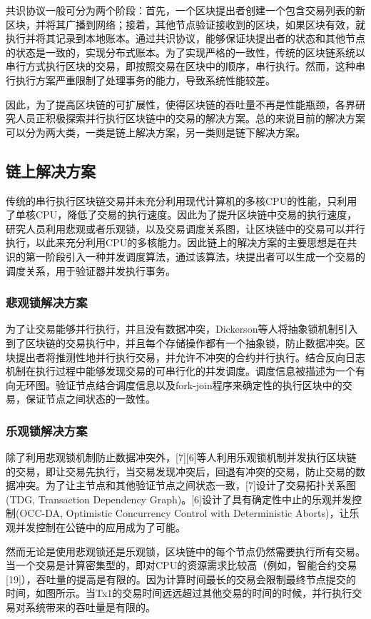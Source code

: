 共识协议一般可分为两个阶段：首先，一个区块提出者创建一个包含交易列表的新区块，并将其广播到网络；接着，其他节点验证接收到的区块，如果区块有效，就执行并将其记录到本地账本。通过共识协议，能够保证块提出者的状态和其他节点的状态是一致的，实现分布式账本。为了实现严格的一致性，传统的区块链系统以串行方式执行区块的交易，即按照交易在区块中的顺序，串行执行。然而，这种串行执行方案严重限制了处理事务的能力，导致系统性能较差。

因此，为了提高区块链的可扩展性，使得区块链的吞吐量不再是性能瓶颈，各界研究人员正积极探索并行执行区块链中的交易的解决方案。总的来说目前的解决方案可以分为两大类，一类是链上解决方案，另一类则是链下解决方案。

\subsection{链上解决方案}
传统的串行执行区块链交易并未充分利用现代计算机的多核CPU的性能，只利用了单核CPU，降低了交易的执行速度。因此为了提升区块链中交易的执行速度，研究人员利用悲观或者乐观锁，以及交易调度关系图，让区块链中的交易可以并行执行，以此来充分利用CPU的多核能力。因此链上的解决方案的主要思想是在共识的第一阶段引入一种并发调度算法，通过该算法，块提出者可以生成一个交易的调度关系，用于验证器并发执行事务。

\subsubsection{悲观锁解决方案}
为了让交易能够并行执行，并且没有数据冲突，Dickerson等人将抽象锁机制引入到了区块链的交易执行中，并且每个存储操作都有一个抽象锁，防止数据冲突。区块提出者将推测性地并行执行交易，并允许不冲突的合约并行执行。结合反向日志机制在执行过程中能够发现交易的可串行化的并发调度。调度信息被描述为一个有向无环图。验证节点结合调度信息以及fork-join程序来确定性的执行区块中的交易，保证节点之间状态的一致性。

\subsubsection{乐观锁解决方案}
除了利用悲观锁机制防止数据冲突外，[7][6]等人利用乐观锁机制并发执行区块链的交易，即让交易先执行，当交易发现冲突后，回退有冲突的交易，防止交易的数据冲突。为了让主节点和其他验证节点之间状态一致，[7]设计了交易拓扑关系图(TDG, Transaction Dependency Graph)。[6]设计了具有确定性中止的乐观并发控制(OCC-DA, Optimistic Concurrency Control with Deterministic Aborts)，让乐观并发控制在公链中的应用成为了可能。

然而无论是使用悲观锁还是乐观锁，区块链中的每个节点仍然需要执行所有交易。当一个交易是计算密集型的，即对CPU的资源需求比较高（例如，智能合约交易[19]），吞吐量的提高是有限的。因为计算时间最长的交易会限制最终节点提交的时间，如图所示。当Tx1的交易时间远远超过其他交易的时间的时候，并行执行交易对系统带来的吞吐量是有限的。

